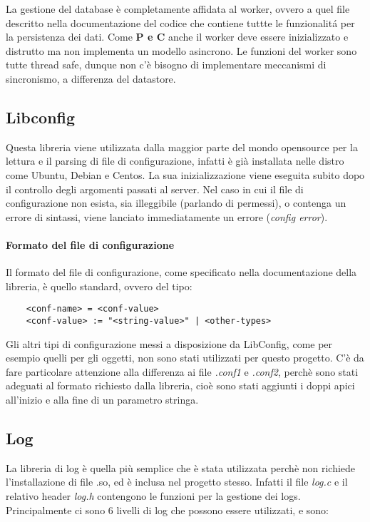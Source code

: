 \documentclass[]{article}
\begin{document}
La gestione del database \`e completamente affidata al worker, ovvero a quel file descritto nella documentazione
del codice che contiene tuttte le funzionalit\'a per la persistenza dei dati.
Come \textbf{P e C} anche il worker deve essere inizializzato e distrutto ma non implementa un modello asincrono.
Le funzioni del worker sono tutte thread safe, dunque non c'\`e bisogno di implementare meccanismi di sincronismo, a
differenza del datastore.

\subsection{Libconfig}
Questa libreria viene utilizzata dalla maggior parte del mondo opensource per la lettura e il parsing di file
di configurazione, infatti \`e gi\`a installata nelle distro come Ubuntu, Debian e Centos.
La sua inizializzazione viene eseguita subito dopo il controllo degli argomenti passati al server.
Nel caso in cui il file di configurazione non esista, sia illeggibile (parlando di permessi), o contenga
un errore di sintassi, viene lanciato immediatamente un errore (\textit{config error}).

\paragraph{Formato del file di configurazione}
Il formato del file di configurazione, come specificato nella documentazione della libreria, \`e quello standard,
ovvero del tipo:
\begin{lstlisting}
	<conf-name> = <conf-value>
	<conf-value> := "<string-value>" | <other-types>
\end{lstlisting}
Gli altri tipi di configurazione messi a disposizione da LibConfig, come per esempio quelli per gli oggetti,
non sono stati utilizzati per questo progetto.
C'\`e da fare particolare attenzione alla differenza ai file \textit{.conf1} e \textit{.conf2}, perch\`e sono stati
adeguati al formato richiesto dalla libreria, cio\`e sono stati aggiunti i doppi apici all'inizio e alla fine di un
parametro stringa.

\subsection{Log}
La libreria di log \`e quella pi\`u semplice che \`e stata utilizzata perch\`e non richiede l'installazione di file .so,
ed \`e inclusa nel progetto stesso. Infatti il file \textit{log.c} e il relativo header \textit{log.h} contengono
le funzioni per la gestione dei logs.
Principalmente ci sono 6 livelli di log che possono essere utilizzati, e sono:
\end{document}
